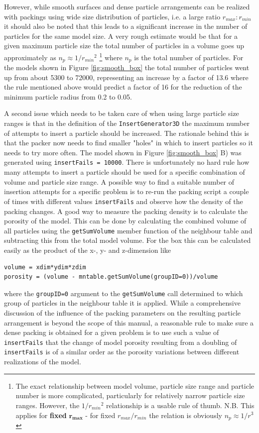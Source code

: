However, while smooth surfaces and dense particle arrangements can be realized with packings using wide size distribution of particles, i.e. a large ratio $r_{max} : r_{min}$ it should also be noted that this leads to a significant increase in the number of particles for the same model size. A very rough estimate would be that for a given maximum particle size the total number of particles in a volume goes up approximately as $n_p \approx 1 / {r_{min}}^2 $ \footnote{The exact relationship between model volume, particle size range and particle number is more complicated, particularly for relatively narrow particle size ranges. However, the $ 1 / {r_{min}}^2 $ relationship is a usable rule of thumb. N.B. This applies for \textbf{fixed} $\mathbf{r_{max}}$  - for fixed $ r_{max} / r_{min} $  the relation is obviously  $n_p \approx 1 / r^3 $ } where $n_p$ is the total number of particles. For the models shown in Figure \ref{fig:smooth_box} the total number of particles went up from about 5300 to 72000, representing an increase by a factor of 13.6 where the rule mentioned above would predict a factor of 16 for the reduction of the minimum particle radius from 0.2 to 0.05. \par
A second issue which needs to be taken care of when using large particle size ranges is that in the definition of the \texttt{InsertGenerator3D} the maximum number of attempts to insert a particle should be increased. The rationale behind this is that the packer now needs to find smaller "holes" in which to insert particles so it needs to try more often. The model shown in Figure \ref{fig:smooth_box} B) was generated using \texttt{insertFails = 10000}. There is unfortunately no hard rule how many attempts to insert a particle should be used for a specific combination of volume and particle size range. A possible way to find a suitable number of insertion attempts for a specific problem is to re-run the packing script a couple of times with different values \texttt{insertFails} and observe how the density of the packing changes. A good way to measure the packing density is to calculate the porosity of the model. This can be done by calculating the combined volume of all particles using the \texttt{getSumVolume} member function of the neighbour table and subtracting this from the total model volume. For the box this can be calculated easily as the product of the x-, y- and z-dimension like
\begin{verbatim}
volume = xdim*ydim*zdim
porosity = (volume - mntable.getSumVolume(groupID=0))/volume
\end{verbatim}
where the \texttt{groupID=0} argument to the \texttt{getSumVolume} call determined to which group of particles in the neighbour table it is applied. While a comprehensive discussion of the influence of the packing parameters on the resulting particle arrangement is beyond the scope of this manual, a reasonable rule to make sure a dense packing is obtained for a given problem is to use such a value of \texttt{insertFails} that the change of model porosity resulting from a doubling of \texttt{insertFails} is of a similar order as the porosity variations between different realizations of the model.
  
